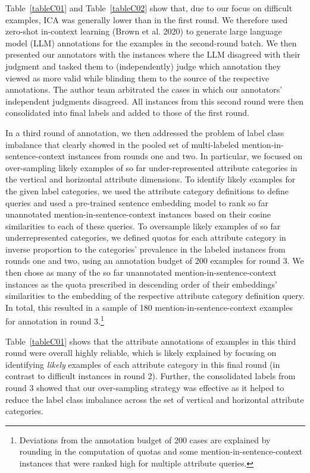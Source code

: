\documentclass[12pt]{article}
\begin{document}
Table~\ref{tableC01} and Table~\ref{tableC02} show that, due to our focus on difficult examples, ICA was generally lower than in the first round.
We therefore used zero-shot in-context learning (Brown et al. 2020) to generate large language model (LLM) annotations for the examples in the second-round batch.
We then presented our annotators with the instances where the LLM disagreed with their judgment and tasked them to (independently) judge which annotation they viewed as more valid while blinding them to the source of the respective annotations.
The author team arbitrated the cases in which our annotators' independent judgments disagreed.
All instances from this second round were then consolidated into final labels and added to those of the first round.

%

%

In a third round of annotation, we then addressed the problem of label class imbalance that clearly showed in the pooled set of multi-labeled mention-in-sentence-context instances from rounds one and two.
In particular, we focused on over-sampling likely examples of so far under-represented attribute categories in the vertical and horizontal attribute dimensions.
To identify likely examples for the given label categories, we used the attribute category definitions to define queries and used a pre-trained sentence embedding model to rank so far unannotated mention-in-sentence-context instances based on their cosine similarities to each of these queries.
To oversample likely examples of so far underrepresented categories, we defined quotas for each attribute category in inverse proportion to the categories' prevalence in the labeled instances from rounds one and two, using an annotation budget of 200 examples for round 3.
We then chose as many of the so far unannotated mention-in-sentence-context instances as the quota prescribed in descending order of their embeddings' similarities to the embedding of the respective attribute category definition query.
In total, this resulted in a sample of 180 mention-in-sentence-context examples for annotation in round 3.\footnote{Deviations from the annotation budget of 200 cases are explained by rounding in the computation of quotas and some mention-in-sentence-context instances that were ranked high for multiple attribute queries.}

Table~\ref{tableC01} shows that the attribute annotations of examples in this third round were overall highly reliable, which is likely explained by focusing on identifying \emph{likely} examples of each attribute category in this final round (in contrast to difficult instances in round 2).
Further, the consolidated labels from round 3 showed that our over-sampling strategy was effective as it helped to reduce the label class imbalance across the set of vertical and horizontal attribute categories.
\end{document}
